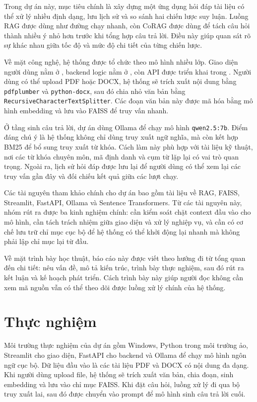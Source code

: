 \documentclass[10pt, conference, a4paper]{IEEEtran}
\begin{document}
Trong dự án này, mục tiêu chính là xây dựng một ứng dụng hỏi đáp tài liệu có thể xử lý nhiều định dạng, lưu lịch sử và so sánh hai chiến lược suy luận. Luồng RAG được dùng như đường chạy nhanh, còn CoRAG được dùng để tách câu hỏi thành nhiều ý nhỏ hơn trước khi tổng hợp câu trả lời. Điều này giúp quan sát rõ sự khác nhau giữa tốc độ và mức độ chi tiết của từng chiến lược.

Về mặt công nghệ, hệ thống được tổ chức theo mô hình nhiều lớp. Giao diện người dùng nằm ở , backend logic nằm ở , còn API được triển khai trong . Người dùng có thể upload PDF hoặc DOCX, hệ thống sẽ trích xuất nội dung bằng \texttt{pdfplumber} và \texttt{python-docx}, sau đó chia nhỏ văn bản bằng \texttt{RecursiveCharacterTextSplitter}. Các đoạn văn bản này được mã hóa bằng mô hình embedding  và lưu vào FAISS để truy vấn nhanh.

Ở tầng sinh câu trả lời, dự án dùng Ollama để chạy mô hình \texttt{qwen2.5:7b}. Điểm đáng chú ý là hệ thống không chỉ dùng truy xuất ngữ nghĩa, mà còn kết hợp BM25 để bổ sung truy xuất từ khóa. Cách làm này phù hợp với tài liệu kỹ thuật, nơi các từ khóa chuyên môn, mã định danh và cụm từ lặp lại có vai trò quan trọng. Ngoài ra, lịch sử hỏi đáp được lưu lại để người dùng có thể xem lại các truy vấn gần đây và đối chiếu kết quả giữa các lượt chạy.

Các tài nguyên tham khảo chính cho dự án bao gồm tài liệu về RAG, FAISS, Streamlit, FastAPI, Ollama và Sentence Transformers. Từ các tài nguyên này, nhóm rút ra được ba kinh nghiệm chính: cần kiểm soát chặt context đầu vào cho mô hình, cần tách trách nhiệm giữa giao diện và xử lý nghiệp vụ, và cần có cơ chế lưu trữ chỉ mục cục bộ để hệ thống có thể khởi động lại nhanh mà không phải lập chỉ mục lại từ đầu.

Về mặt trình bày học thuật, báo cáo này được viết theo hướng đi từ tổng quan đến chi tiết: nêu vấn đề, mô tả kiến trúc, trình bày thực nghiệm, sau đó rút ra kết luận và kế hoạch phát triển. Cách trình bày này giúp người đọc không cần xem mã nguồn vẫn có thể theo dõi được luồng xử lý chính của hệ thống.

\section{Thực nghiệm}
Môi trường thực nghiệm của dự án gồm Windows, Python trong môi trường ảo, Streamlit cho giao diện, FastAPI cho backend và Ollama để chạy mô hình ngôn ngữ cục bộ. Dữ liệu đầu vào là các tài liệu PDF và DOCX có nội dung đa dạng. Khi người dùng upload file, hệ thống sẽ trích xuất văn bản, chia đoạn, sinh embedding và lưu vào chỉ mục FAISS. Khi đặt câu hỏi, luồng xử lý đi qua bộ truy xuất lai, sau đó được chuyển vào prompt để mô hình sinh câu trả lời cuối.
\end{document}
